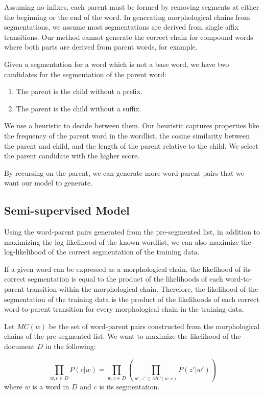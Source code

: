 \documentclass[11pt,twocolumn]{article}
\begin{document}
Assuming no infixes, each parent must be formed by removing segments at either the beginning or the end of the word. In generating morphological chains from segmentations, we assume most segmentations are derived from single affix transitions. Our method cannot generate the correct chain for compound words where both parts are derived from parent words, for example.

Given a segmentation for a word which is not a base word, we have two candidates for the segmentation of the parent word:
\begin{enumerate}[label=(\arabic*)]
    \item The parent is the child without a prefix.
    \item The parent is the child without a suffix.
\end{enumerate}

We use a heuristic to decide between them. Our heuristic captures properties like the frequency of the parent word in the wordlist, the cosine similarity between the parent and child, and the length of the parent relative to the child. We select the parent candidate with the higher score.

By recursing on the parent, we can generate more word-parent pairs that we want our model to generate.

\subsection{Semi-supervised Model}
Using the word-parent pairs generated from the pre-segmented list, 
in addition to maximizing the log-likelihood of the known wordlist,
we can also maximize the log-likelihood of the correct segmentation of the training data.

If a given word can be expressed as a morphological chain, the likelihood of its correct segmentation
is equal to the product of the likelihoods of each word-to-parent transition within the morphological chain.
Therefore, the likelihood of the segmentation of the training data is the product of the likelihoods
of each correct word-to-parent transition for every morphological chain in the training data.

Let $MC(w)$ be the set of word-parent pairs constructed from the morphological chains of the pre-segmented list.
We want to maximize the likelihood of the document $D$ in the following:

\begin{equation}
    \prod_{w, c \in D} P(c | w) = \prod_{w, c \in D}\left(\prod_{w', z' \in MC(w, c)} P(z' | w')\right)
\end{equation}
where $w$ is a word in $D$ and $c$ is its segmentation.
\end{document}
